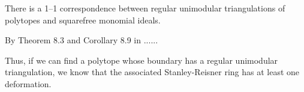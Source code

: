 
\begin{proposition}
\label{eq:unimodular_triangs}
There is a 1--1 correspondence between regular unimodular triangulations of polytopes and squarefree monomial ideals.
\end{proposition}

By Theorem 8.3 and Corollary 8.9 in \cite{sturmfels}......

Thus, if we can find a polytope whose boundary has a regular unimodular triangulation, we know that the associated Stanley-Reisner ring has at least one deformation. 

